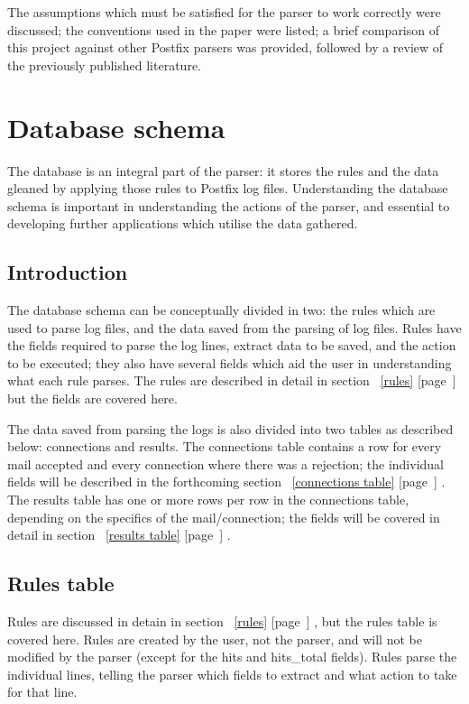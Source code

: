 \documentclass[a4paper,12pt,draft]{article}
\newcommand{\refwithpage}[1]{%
    \empty{}\ref{#1} [page~\pageref{#1}]%
}
\begin{document}
The assumptions which must be satisfied for the parser to work correctly
were discussed; the conventions used in the paper were listed; a brief
comparison of this project against other Postfix parsers was provided,
followed by a review of the previously published literature.

\section{Database schema}
\label{database schema}

The database is an integral part of the parser: it stores the rules and the
data gleaned by applying those rules to Postfix log files.  Understanding
the database schema is important in understanding the actions of the
parser, and essential to developing further applications which utilise the
data gathered.

\subsection{Introduction}

The database schema can be conceptually divided in two: the rules which are
used to parse log files, and the data saved from the parsing of log files.
Rules have the fields required to parse the log lines, extract data to be
saved, and the action to be executed; they also have several fields which
aid the user in understanding what each rule parses.  The rules are
described in detail in section~\refwithpage{rules} but the fields are
covered here.

The data saved from parsing the logs is also divided into two tables as
described below: connections and results.  The connections table contains a
row for every mail accepted and every connection where there was a
rejection; the individual fields will be described in the forthcoming
section~\refwithpage{connections table}.  The results table has one or more
rows per row in the connections table, depending on the specifics of the
mail/connection; the fields will be covered in detail in
section~\refwithpage{results table}.

\subsection{Rules table}

\label{rule attributes}

Rules are discussed in detain in section~\refwithpage{rules}, but the rules
table is covered here.  Rules are created by the user, not the parser, and
will not be modified by the parser (except for the hits and hits\_total
fields).  Rules parse the individual lines, telling the parser which fields
to extract and what action to take for that line.
\end{document}
